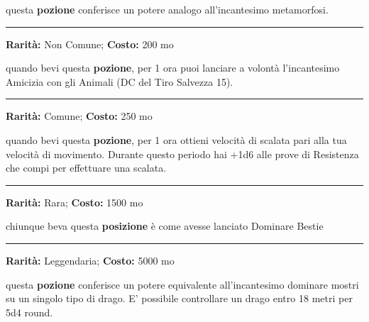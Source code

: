 \begin{multicols}{2}
questa \textbf{pozione} conferisce un potere analogo all'incantesimo metamorfosi.

\smallskip\noindent\rule{\linewidth}{2pt}  \hypertarget{PozionediAmiciziacongliAnimali}{}\smallskip{}\noindent\label{PozionediAmiciziacongliAnimali}

\textbf{Rarità:} Non Comune; \textbf{Costo:} 200 mo

quando bevi questa \textbf{pozione}, per 1 ora puoi lanciare a volontà l'incantesimo Amicizia con gli Animali (DC del Tiro Salvezza 15).

\smallskip\noindent\rule{\linewidth}{2pt}  \hypertarget{PozionediArrampicata}{}\smallskip{}\noindent\label{PozionediArrampicata}

\textbf{Rarità:} Comune; \textbf{Costo:} 250 mo

quando bevi questa \textbf{pozione}, per 1 ora ottieni velocità di scalata pari alla tua velocità di movimento. Durante questo periodo hai +1d6 alle prove di Resistenza che compi per effettuare una scalata.

\smallskip\noindent\rule{\linewidth}{2pt}  \hypertarget{PozionediControllodeglianimali}{}\smallskip{}\noindent\label{PozionediControllodeglianimali}

\textbf{Rarità:} Rara; \textbf{Costo:} 1500 mo

chiunque beva questa \textbf{posizione} è come avesse lanciato Dominare Bestie

\smallskip\noindent\rule{\linewidth}{2pt}  \hypertarget{PozionediControllodeidraghi}{}\smallskip{}\noindent\label{PozionediControllodeidraghi}

\textbf{Rarità:} Leggendaria; \textbf{Costo:} 5000 mo

questa \textbf{pozione} conferisce un potere equivalente all'incantesimo dominare mostri su un singolo tipo di drago. E' possibile controllare un drago entro 18 metri per 5d4 round.


\end{multicols}
